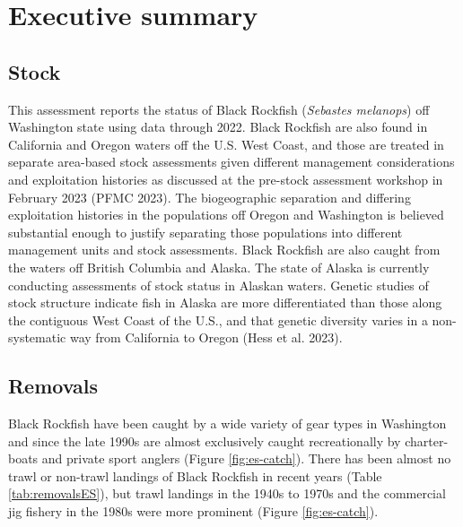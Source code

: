 \documentclass[11pt,
  english,
  letterpaper,
]{article}
\begin{document}
\newpage

\hypertarget{executive-summary}{%
\section*{Executive summary}\label{executive-summary}}

\hypertarget{stock}{%
\subsection*{Stock}\label{stock}}

This assessment reports the status of Black Rockfish (\emph{Sebastes melanops}) off Washington state using data through 2022. Black Rockfish are also found in California and Oregon waters off the U.S. West Coast, and those are treated in separate area-based stock assessments given different management considerations and exploitation histories as discussed at the pre-stock assessment workshop in February 2023 (PFMC 2023). The biogeographic separation and differing exploitation histories in the populations off Oregon and Washington is believed substantial enough to justify separating those populations into different management units and stock assessments. Black Rockfish are also caught from the waters off British Columbia and Alaska. The state of Alaska is currently conducting assessments of stock status in Alaskan waters. Genetic studies of stock structure indicate fish in Alaska are more differentiated than those along the contiguous West Coast of the U.S., and that genetic diversity varies in a non-systematic way from California to Oregon (Hess et al. 2023).

\hypertarget{removals}{%
\subsection*{Removals}\label{removals}}

Black Rockfish have been caught by a wide variety of gear types in Washington and since the late 1990s are almost exclusively caught recreationally by charter-boats and private sport anglers (Figure \ref{fig:es-catch}). There has been almost no trawl or non-trawl landings of Black Rockfish in recent years (Table \ref{tab:removalsES}), but trawl landings in the 1940s to 1970s and the commercial jig fishery in the 1980s were more prominent (Figure \ref{fig:es-catch}).
\end{document}
